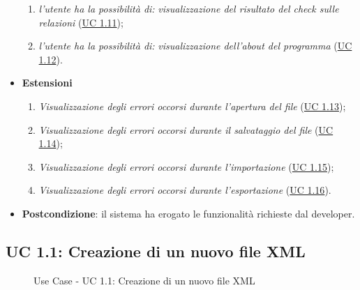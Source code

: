 \begin{itemize}
\begin{enumerate}
				\item \textit{l'utente ha la possibilità di:} \textit{visualizzazione del risultato del check sulle relazioni} (\hyperref[subsec:XEUC1.11]{UC 1.11});
				
				\item \textit{l'utente ha la possibilità di:} \textit{visualizzazione dell'about del programma} (\hyperref[subsec:XEUC1.12]{UC 1.12}).
				
			\end{enumerate}
			\item \textbf{Estensioni}
			\begin{enumerate}
				\item\textit{Visualizzazione degli errori occorsi durante l'apertura del file} (\hyperref[subsec:XEUC1.13]{UC 1.13});
				
				\item\textit{Visualizzazione degli errori occorsi durante il salvataggio del file} (\hyperref[subsec:XEUC1.14]{UC 1.14});
				
				\item\textit{Visualizzazione degli errori occorsi durante l'importazione} (\hyperref[subsec:XEUC1.15]{UC 1.15});
				
				\item\textit{Visualizzazione degli errori occorsi durante l'esportazione} (\hyperref[subsec:XEUC1.16]{UC 1.16}).
			\end{enumerate}
			\item\textbf{Postcondizione}: il sistema ha erogato le funzionalità richieste dal developer.
		\end{itemize}

	\subsection{UC 1.1: Creazione di un nuovo file XML}
		\label{subsec:XEUC1.1}
	
		\begin{figure}[!h] 
			\centering 
			\caption{Use Case - UC 1.1: Creazione di un nuovo file XML}
		\end{figure}
		
